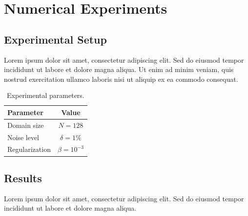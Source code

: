 \section{Numerical Experiments}\label{sec:numerics}


\subsection{Experimental Setup}\label{ssec:numerics_setup}

Lorem ipsum dolor sit amet, consectetur adipiscing elit. Sed do eiusmod tempor
incididunt ut labore et dolore magna aliqua. Ut enim ad minim veniam, quis
nostrud exercitation ullamco laboris nisi ut aliquip ex ea commodo consequat.

\begin{table}[!htb]
    \centering
    \caption{Experimental parameters.}
    \label{tab:setup}
    \begin{tabular}{lc}
        \toprule
        Parameter & Value \\
        \midrule
        Domain size  & $N = 128$ \\
        Noise level  & $\delta = 1\%$ \\
        Regularization & $\beta = 10^{-3}$ \\
        \bottomrule
    \end{tabular}
\end{table}

\subsection{Results}\label{ssec:results}

Lorem ipsum dolor sit amet, consectetur adipiscing elit. Sed do eiusmod tempor
incididunt ut labore et dolore magna aliqua.

